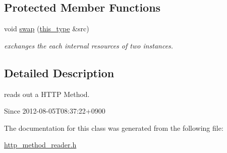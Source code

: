 \subsection*{Protected Member Functions}
\begin{DoxyCompactItemize}
\item 
\hypertarget{classhryky_1_1http_1_1method_1_1_reader_a4613c2aa7c596ebc24d339b31a8d4761}{void \hyperlink{classhryky_1_1http_1_1method_1_1_reader_a4613c2aa7c596ebc24d339b31a8d4761}{swap} (\hyperlink{classhryky_1_1http_1_1method_1_1_reader_acbfb161bac6c8d7c1eacb754150061a1}{this\-\_\-type} \&src)}\label{classhryky_1_1http_1_1method_1_1_reader_a4613c2aa7c596ebc24d339b31a8d4761}

\begin{DoxyCompactList}\small\item\em exchanges the each internal resources of two instances. \end{DoxyCompactList}\end{DoxyCompactItemize}


\subsection{Detailed Description}
reads out a H\-T\-T\-P Method. 

\begin{DoxySince}{Since}
2012-\/08-\/05\-T08\-:37\-:22+0900 
\end{DoxySince}


The documentation for this class was generated from the following file\-:\begin{DoxyCompactItemize}
\item 
\hyperlink{http__method__reader_8h}{http\-\_\-method\-\_\-reader.\-h}\end{DoxyCompactItemize}
